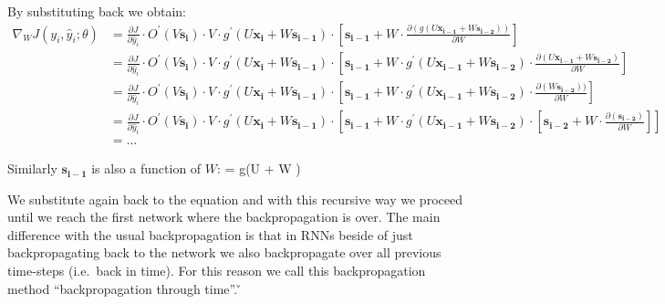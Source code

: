 By substituting back we obtain:
{\setlength{\jot}{5pt}
\begin{align*}
\nabla_W J(y_i, \hat{y}_i ; \theta) & = \frac{\partial J}{\partial \hat{y}_i} \cdot O^\prime(V \boldsymbol{s_i})
\cdot V \cdot g^\prime(U \boldsymbol{x_i} + W \boldsymbol{s_{i-1}}) \cdot \left[ \boldsymbol{s_{i-1}} + W
\cdot \frac{\partial (g(U \boldsymbol{x_{i-1}} + W \boldsymbol{s_{i-2}}))} {\partial W} \right] \\
& = \frac{\partial J}{\partial \hat{y}_i} \cdot O^\prime(V\boldsymbol{s_i})
\cdot V \cdot g^\prime(U\boldsymbol{x_i} + W \boldsymbol{s_{i-1}})
\cdot \left[\boldsymbol{s_{i-1}} + W \cdot g^\prime (U\boldsymbol{x_{i-1}} + W \boldsymbol{s_{i-2}})
\cdot \frac{\partial (U\boldsymbol{x_{i-1}} + W \boldsymbol{s_{i-2}})} {\partial W} \right] \\
&= \frac{\partial J}{\partial \hat{y}_i} \cdot O^\prime(V\boldsymbol{s_i}) \cdot V
\cdot g^\prime(U\boldsymbol{x_i} + W \boldsymbol{s_{i-1}}) \cdot \left[\boldsymbol{s_{i-1}} + W \cdot g^\prime
(U \boldsymbol{x_{i-1}} + W \boldsymbol{s_{i-2}}) \cdot \frac{\partial (W \boldsymbol{s_{i-2}}))} {\partial W} \right] \\
&= \frac{\partial J}{\partial \hat{y}_i} \cdot O^\prime(V \boldsymbol{s_i}) \cdot V
\cdot g^\prime(U \boldsymbol{x_i} + W \boldsymbol{s_{i-1}}) \cdot \left[\boldsymbol{s_{i-1}} + W \cdot g^\prime
(U \boldsymbol{x_{i-1}} + W \boldsymbol{s_{i-2}}) \cdot \left[\boldsymbol{s_{i-2}} + W
\cdot \frac{\partial(\boldsymbol{s_{i-2}})} {\partial W} \right] \right] \\ &= \ldots
\end{align*}}

Similarly $\boldsymbol{s_{i-1}}$ is also a function of $W$:
\bse
{}= g(U  + W )
\ese

We substitute again back to the equation and with this recursive way we proceed until we reach the first network
where the backpropagation is over. The main difference with the usual backpropagation is that in RNNs beside of just
backpropagating back to the network we also backpropagate over all previous time-steps (i.e.\ back in time). For this
reason we call this backpropagation method ``backpropagation through time''. \v

